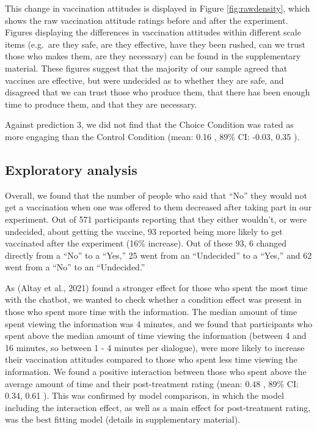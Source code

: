 \documentclass[
  english,
  ,jou,floatsintext]{apa6}
\begin{document}
This change in vaccination attitudes is displayed in Figure \ref{fig:rawdensity}, which shows the raw vaccination attitude ratings before and after the experiment. Figures displaying the differences in vaccination attitudes within different scale items (e.g.~are they safe, are they effective, have they been rushed, can we trust those who makes them, are they necessary) can be found in the supplementary material. These figures suggest that the majority of our sample agreed that vaccines are effective, but were undecided as to whether they are safe, and disagreed that we can trust those who produce them, that there has been enough time to produce them, and that they are necessary.

Against prediction 3, we did not find that the Choice Condition was rated as more engaging than the Control Condition (mean: 0.16 , 89\% CI: -0.03, 0.35 ).

\hypertarget{exploratory-analysis}{%
\subsection{Exploratory analysis}\label{exploratory-analysis}}

Overall, we found that the number of people who said that ``No'' they would not get a vaccination when one was offered to them decreased after taking part in our experiment. Out of 571 participants reporting that they either wouldn't, or were undecided, about getting the vaccine, 93 reported being more likely to get vaccinated after the experiment (16\% increase). Out of these 93, 6 changed directly from a ``No'' to a ``Yes,'' 25 went from an ``Undecided'' to a ``Yes,'' and 62 went from a ``No'' to an ``Undecided.''

As (Altay et al., 2021) found a stronger effect for those who spent the most time with the chatbot, we wanted to check whether a condition effect was present in those who spent more time with the information. The median amount of time spent viewing the information was 4 minutes, and we found that participants who spent above the median amount of time viewing the information (between 4 and 16 minutes, so between 1 - 4 minutes per dialogue), were more likely to increase their vaccination attitudes compared to those who spent less time viewing the information. We found a positive interaction between those who spent above the average amount of time and their post-treatment rating (mean: 0.48 , 89\% CI: 0.34, 0.61 ). This was confirmed by model comparison, in which the model including the interaction effect, as well as a main effect for post-treatment rating, was the best fitting model (details in supplementary material).
\end{document}
